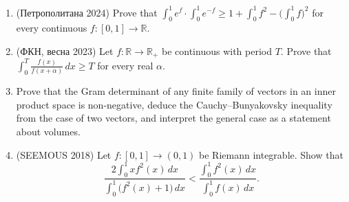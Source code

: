 \documentclass[11pt,a4paper]{article}
\begin{document}
\begin{enumerate}
\item (\foreignlanguage{russian}{Петрополитана} 2024) Prove that
$\int_0^1e^f\cdot\int_0^1e^{-f}\geqslant1+\int_0^1f^2-\bigl(\int_0^1f\bigr)^2$ for every
continuous $f\colon[0,1]\to\mathbb R$.

\item (\foreignlanguage{russian}{ФКН, весна} 2023) Let $f\colon\mathbb R\to\mathbb R_+$ be
continuous with period $T$. Prove that $\int_0^T\frac{f(x)}{f(x+\alpha)}\,dx\geqslant T$ for every
real $\alpha$.

\item Prove that the Gram determinant of any finite family of vectors in an inner product space
is non-negative, deduce the Cauchy--Bunyakovsky inequality from the case of two vectors, and
interpret the general case as a statement about volumes.

\item (SEEMOUS 2018) Let $f\colon[0,1]\to(0,1)$ be Riemann integrable. Show that
\[
\frac{2\int_0^1xf^2(x)\,dx}{\int_0^1\bigl(f^2(x)+1\bigr)\,dx}<
\frac{\int_0^1f^2(x)\,dx}{\int_0^1f(x)\,dx}.
\]
\end{enumerate}
\end{document}
